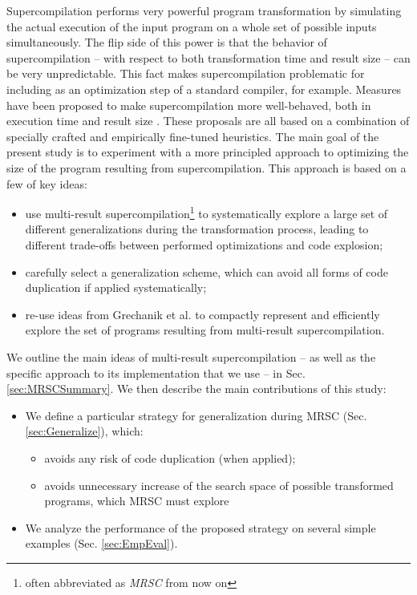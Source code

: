 \documentclass[submission,copyright,creativecommons]{eptcs}
\begin{document}
Supercompilation performs very powerful program transformation by simulating
the actual execution of the input program on a whole set of possible inputs
simultaneously.
The flip side of this power is that the behavior of supercompilation -- 
with respect to both transformation time and result size --
can be very unpredictable.
This fact makes supercompilation problematic for including as an
optimization step of a standard compiler, for example.
Measures have been proposed to make supercompilation more
well-behaved, both in execution time and result size \cite{bolingbroke2011improving,Jonsson2011Taming}.
These proposals are all based on a combination of specially crafted and
empirically fine-tuned heuristics.
The main goal of the present study is to experiment with a more
principled approach to optimizing the size of the program resulting
from supercompilation.
This approach is based on a few of key ideas:
\begin{itemize}
  \item use multi-result supercompilation\footnote{often abbreviated as \emph{MRSC} from now on} 
    \cite{KlyuchnikovMRSCBranch,Klyuchnikov:META2012:MRSC,Romanenko2014StagedMRSC}
    to systematically explore a large set of different generalizations during 
    the transformation process, 
    leading to different trade-offs between performed optimizations and code explosion;
  \item carefully select a generalization scheme, which can avoid all forms of
    code duplication if applied systematically;
  \item re-use ideas from Grechanik et al. \cite{Romanenko2014StagedMRSC} to compactly represent and efficiently
    explore the set of programs resulting from multi-result supercompilation.
\end{itemize}
We outline the main ideas of multi-result supercompilation --
as well as the specific approach to its implementation that we use --
in Sec. \ref{sec:MRSCSummary}. We then describe the main contributions of this study:
\begin{itemize}
  \item We define a particular strategy for generalization during MRSC (Sec. \ref*{sec:Generalize}), which:
    \begin{itemize}
      \item avoids any risk of code duplication (when applied);
      \item avoids unnecessary increase of the search space of possible
        transformed programs, which MRSC must explore
    \end{itemize}
  \item We analyze the performance of the proposed strategy on several
    simple examples (Sec. \ref*{sec:EmpEval}).
\end{itemize}
\end{document}
